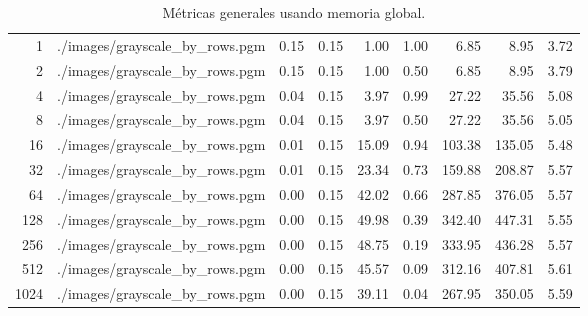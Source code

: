 \begin{table}[H]
\begin{adjustbox}{width=\textwidth, keepaspectratio}
\begin{tabular}{rlrrrrrrr}
                           1 &     ./images/grayscale\_by\_rows.pgm &     0.15 &     0.15 &     1.00 &        1.00 &     6.85 &                      8.95 &                    3.72 \\
                           2 &     ./images/grayscale\_by\_rows.pgm &     0.15 &     0.15 &     1.00 &        0.50 &     6.85 &                      8.95 &                    3.79 \\
                           4 &     ./images/grayscale\_by\_rows.pgm &     0.04 &     0.15 &     3.97 &        0.99 &    27.22 &                     35.56 &                    5.08 \\
                           8 &     ./images/grayscale\_by\_rows.pgm &     0.04 &     0.15 &     3.97 &        0.50 &    27.22 &                     35.56 &                    5.05 \\
                          16 &     ./images/grayscale\_by\_rows.pgm &     0.01 &     0.15 &    15.09 &        0.94 &   103.38 &                    135.05 &                    5.48 \\
                          32 &     ./images/grayscale\_by\_rows.pgm &     0.01 &     0.15 &    23.34 &        0.73 &   159.88 &                    208.87 &                    5.57 \\
                          64 &     ./images/grayscale\_by\_rows.pgm &     0.00 &     0.15 &    42.02 &        0.66 &   287.85 &                    376.05 &                    5.57 \\
                         128 &     ./images/grayscale\_by\_rows.pgm &     0.00 &     0.15 &    49.98 &        0.39 &   342.40 &                    447.31 &                    5.55 \\
                         256 &     ./images/grayscale\_by\_rows.pgm &     0.00 &     0.15 &    48.75 &        0.19 &   333.95 &                    436.28 &                    5.57 \\
                         512 &     ./images/grayscale\_by\_rows.pgm &     0.00 &     0.15 &    45.57 &        0.09 &   312.16 &                    407.81 &                    5.61 \\
                        1024 &     ./images/grayscale\_by\_rows.pgm &     0.00 &     0.15 &    39.11 &        0.04 &   267.95 &                    350.05 &                    5.59 \\
                    \bottomrule
                    \end{tabular}
                    
            \end{adjustbox}
            \caption{Métricas generales usando memoria global.}
            \label{tab:conv2d}
        \end{table}

